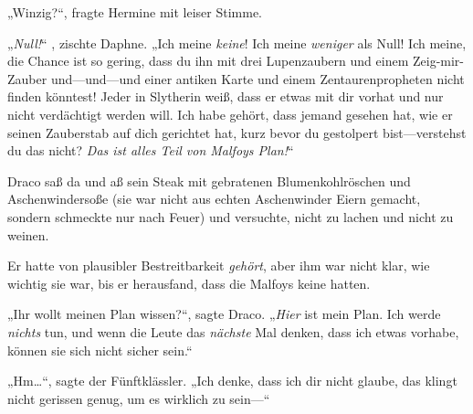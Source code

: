 „Winzig?“, fragte Hermine mit leiser Stimme.

„\emph{Null!}“ , zischte Daphne. „Ich meine \emph{keine}! Ich meine \emph{weniger} als Null! Ich meine, die Chance ist so gering, dass du ihn mit drei Lupenzaubern und einem Zeig-mir-Zauber und—und—und einer antiken Karte und einem Zentaurenpropheten nicht finden könntest! Jeder in Slytherin weiß, dass er etwas mit dir vorhat und nur nicht verdächtigt werden will. Ich habe gehört, dass jemand gesehen hat, wie er seinen Zauberstab auf dich gerichtet hat, kurz bevor du gestolpert bist—verstehst du das nicht? \emph{Das ist alles Teil von Malfoys Plan!}“

\later

Draco saß da und aß sein Steak mit gebratenen Blumenkohlröschen und Aschenwindersoße (sie war nicht aus echten Aschenwinder Eiern gemacht, sondern schmeckte nur nach Feuer) und versuchte, nicht zu lachen und nicht zu weinen.

Er hatte von plausibler Bestreitbarkeit \emph{gehört}, aber ihm war nicht klar, wie wichtig sie war, bis er herausfand, dass die Malfoys keine hatten.

„Ihr wollt meinen Plan wissen?“, sagte Draco. „\emph{Hier} ist mein Plan. Ich werde \emph{nichts} tun, und wenn die Leute das \emph{nächste} Mal denken, dass ich etwas vorhabe, können sie sich nicht sicher sein.“

„Hm…“, sagte der Fünftklässler. „Ich denke, dass ich dir nicht glaube, das klingt nicht gerissen genug, um es wirklich zu sein—“


